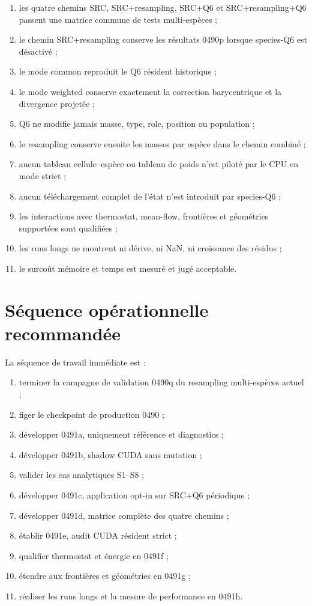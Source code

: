 \documentclass[11pt,a4paper]{article}
\begin{document}
\begin{enumerate}
  \item les quatre chemins SRC, SRC+resampling, SRC+Q6 et SRC+resampling+Q6 passent une matrice commune de tests multi-espèces ;
  \item le chemin SRC+resampling conserve les résultats 0490p lorsque species-Q6 est désactivé ;
  \item le mode common reproduit le Q6 résident historique ;
  \item le mode weighted conserve exactement la correction barycentrique et la divergence projetée ;
  \item Q6 ne modifie jamais masse, type, role, position ou population ;
  \item le resampling conserve ensuite les masses par espèce dans le chemin combiné ;
  \item aucun tableau cellule--espèce ou tableau de poids n'est piloté par le CPU en mode strict ;
  \item aucun téléchargement complet de l'état n'est introduit par species-Q6 ;
  \item les interactions avec thermostat, mean-flow, frontières et géométries supportées sont qualifiées ;
  \item les runs longs ne montrent ni dérive, ni NaN, ni croissance des résidus ;
  \item le surcoût mémoire et temps est mesuré et jugé acceptable.
\end{enumerate}

\section{Séquence opérationnelle recommandée}

La séquence de travail immédiate est :

\begin{enumerate}
  \item terminer la campagne de validation 0490q du resampling multi-espèces actuel ;
  \item figer le checkpoint de production 0490 ;
  \item développer 0491a, uniquement référence et diagnostics ;
  \item développer 0491b, shadow CUDA sans mutation ;
  \item valider les cas analytiques S1--S8 ;
  \item développer 0491c, application opt-in sur SRC+Q6 périodique ;
  \item développer 0491d, matrice complète des quatre chemins ;
  \item établir 0491e, audit CUDA résident strict ;
  \item qualifier thermostat et énergie en 0491f ;
  \item étendre aux frontières et géométries en 0491g ;
  \item réaliser les runs longs et la mesure de performance en 0491h.
\end{enumerate}
\end{document}
